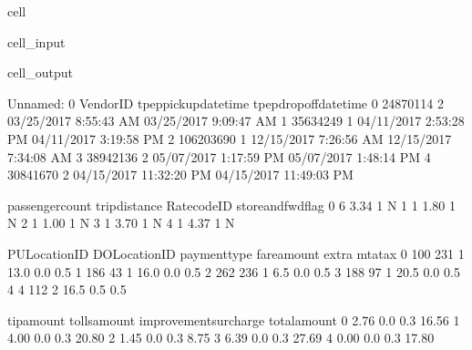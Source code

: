 \documentclass[letterpaper,10pt,english]{sphinxmanual}
\begin{document}
\begin{sphinxuseclass}{cell}
\begin{sphinxuseclass}{cell_input}
\begin{sphinxVerbatim}[commandchars=\\\{\}]
\end{sphinxVerbatim}

\end{sphinxuseclass}
\begin{sphinxuseclass}{cell_output}
\begin{sphinxVerbatim}[commandchars=\\\{\}]
   Unnamed: 0  VendorID    tpep\PYGZus{}pickup\PYGZus{}datetime   tpep\PYGZus{}dropoff\PYGZus{}datetime  \PYGZbs{}
0    24870114         2   03/25/2017 8:55:43 AM   03/25/2017 9:09:47 AM   
1    35634249         1   04/11/2017 2:53:28 PM   04/11/2017 3:19:58 PM   
2   106203690         1   12/15/2017 7:26:56 AM   12/15/2017 7:34:08 AM   
3    38942136         2   05/07/2017 1:17:59 PM   05/07/2017 1:48:14 PM   
4    30841670         2  04/15/2017 11:32:20 PM  04/15/2017 11:49:03 PM   

   passenger\PYGZus{}count  trip\PYGZus{}distance  RatecodeID store\PYGZus{}and\PYGZus{}fwd\PYGZus{}flag  \PYGZbs{}
0                6           3.34           1                  N   
1                1           1.80           1                  N   
2                1           1.00           1                  N   
3                1           3.70           1                  N   
4                1           4.37           1                  N   

   PULocationID  DOLocationID  payment\PYGZus{}type  fare\PYGZus{}amount  extra  mta\PYGZus{}tax  \PYGZbs{}
0           100           231             1         13.0    0.0      0.5   
1           186            43             1         16.0    0.0      0.5   
2           262           236             1          6.5    0.0      0.5   
3           188            97             1         20.5    0.0      0.5   
4             4           112             2         16.5    0.5      0.5   

   tip\PYGZus{}amount  tolls\PYGZus{}amount  improvement\PYGZus{}surcharge  total\PYGZus{}amount  
0        2.76           0.0                    0.3         16.56  
1        4.00           0.0                    0.3         20.80  
2        1.45           0.0                    0.3          8.75  
3        6.39           0.0                    0.3         27.69  
4        0.00           0.0                    0.3         17.80  
\end{sphinxVerbatim}

\end{sphinxuseclass}
\end{sphinxuseclass}
\end{document}
